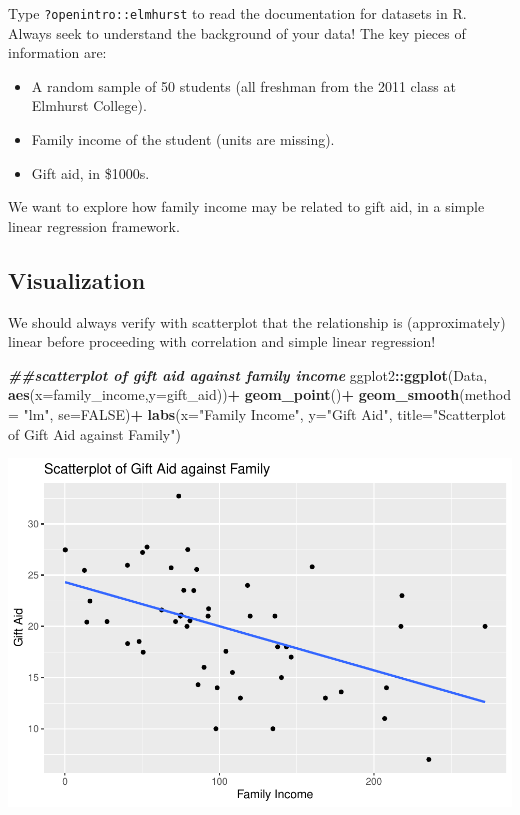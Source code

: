 \documentclass[
]{book}
\newenvironment{Shaded}{\begin{snugshade}}{\end{snugshade}}
\newcommand{\AttributeTok}[1]{\textcolor[rgb]{0.13,0.29,0.53}{#1}}
\newcommand{\ConstantTok}[1]{\textcolor[rgb]{0.56,0.35,0.01}{#1}}
\newcommand{\DocumentationTok}[1]{\textcolor[rgb]{0.56,0.35,0.01}{\textbf{\textit{#1}}}}
\newcommand{\FunctionTok}[1]{\textcolor[rgb]{0.13,0.29,0.53}{\textbf{#1}}}
\newcommand{\NormalTok}[1]{#1}
\newcommand{\SpecialCharTok}[1]{\textcolor[rgb]{0.81,0.36,0.00}{\textbf{#1}}}
\newcommand{\StringTok}[1]{\textcolor[rgb]{0.31,0.60,0.02}{#1}}
\providecommand{\tightlist}{%
  \setlength{\itemsep}{0pt}\setlength{\parskip}{0pt}}
\begin{document}
Type \texttt{?openintro::elmhurst} to read the documentation for datasets in R. Always seek to understand the background of your data! The key pieces of information are:

\begin{itemize}
\tightlist
\item
  A random sample of 50 students (all freshman from the 2011 class at Elmhurst College).
\item
  Family income of the student (units are missing).
\item
  Gift aid, in \$1000s.
\end{itemize}

We want to explore how family income may be related to gift aid, in a simple linear regression framework.

\subsection*{Visualization}\label{visualization}

We should always verify with scatterplot that the relationship is (approximately) linear before proceeding with correlation and simple linear regression!

\begin{Shaded}
\begin{Highlighting}[]
\DocumentationTok{\#\#scatterplot of gift aid against family income}
\NormalTok{ggplot2}\SpecialCharTok{::}\FunctionTok{ggplot}\NormalTok{(Data, }\FunctionTok{aes}\NormalTok{(}\AttributeTok{x=}\NormalTok{family\_income,}\AttributeTok{y=}\NormalTok{gift\_aid))}\SpecialCharTok{+}
  \FunctionTok{geom\_point}\NormalTok{()}\SpecialCharTok{+}
  \FunctionTok{geom\_smooth}\NormalTok{(}\AttributeTok{method =} \StringTok{"lm"}\NormalTok{, }\AttributeTok{se=}\ConstantTok{FALSE}\NormalTok{)}\SpecialCharTok{+}
  \FunctionTok{labs}\NormalTok{(}\AttributeTok{x=}\StringTok{"Family Income"}\NormalTok{, }\AttributeTok{y=}\StringTok{"Gift Aid"}\NormalTok{, }\AttributeTok{title=}\StringTok{"Scatterplot of Gift Aid against Family"}\NormalTok{)}
\end{Highlighting}
\end{Shaded}

\includegraphics{bookdown-demo_files/figure-latex/unnamed-chunk-14-1.pdf}
\end{document}
